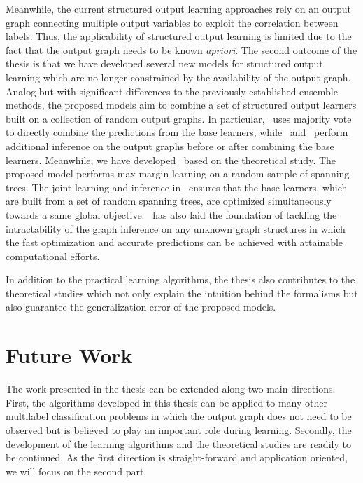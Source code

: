 {Meanwhile, the current structured output learning approaches rely on an output graph connecting multiple output variables to exploit the correlation between labels.
Thus, the applicability of structured output learning is limited due to the fact that the output graph needs to be known \textit{apriori}.
The second outcome of the thesis is that we have developed several new models for structured output learning which are no longer constrained by the availability of the output graph.
Analog but with significant differences to the previously established ensemble methods, the proposed models aim to combine a set of structured output learners built on a collection of random output graphs.
In particular, \mve\ uses majority vote to directly combine the predictions from the base learners, while \amm\ and \mam\ perform additional inference on the output graphs before or after combining the base learners.
Meanwhile, we have developed \rta\ based on the theoretical study.
The proposed model performs max-margin learning on a random sample of spanning trees.
The joint learning and inference in \rta\ ensures that the base learners, which are built from a set of random spanning trees, are optimized simultaneously towards a same global objective.
\rta\ has also laid the foundation of tackling the intractability of the graph inference on any unknown graph structures in which the fast optimization and accurate predictions can be achieved with attainable computational efforts.

In addition to the practical learning algorithms, the thesis also contributes to the theoretical studies which not only explain the intuition behind the formalisms but also guarantee the generalization error of the proposed models.



\section{Future Work}

The work presented in the thesis can be extended along two main directions.
First, the algorithms developed in this thesis can be applied to many other multilabel classification problems in which the output graph does not need to be observed but is believed to play an important role during learning.
Secondly, the development of the learning algorithms and the theoretical studies are readily to be continued.
As the first direction is straight-forward and application oriented, we will focus on the second part.

}
